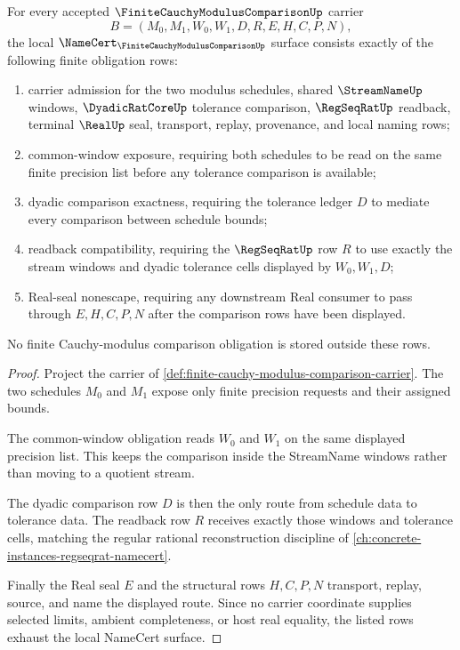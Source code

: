 \begin{theorem}
\label{thm:finite-cauchy-modulus-comparison-namecert-obligations}
For every accepted $\FiniteCauchyModulusComparisonUp$ carrier
$$
B=(M_0,M_1,W_0,W_1,D,R,E,H,C,P,N),
$$
the local $\NameCert_{\FiniteCauchyModulusComparisonUp}$ surface consists exactly of the following finite obligation rows:
\begin{enumerate}
\item carrier admission for the two modulus schedules, shared $\StreamNameUp$ windows, $\DyadicRatCoreUp$ tolerance comparison, $\RegSeqRatUp$ readback, terminal $\RealUp$ seal, transport, replay, provenance, and local naming rows;
\item common-window exposure, requiring both schedules to be read on the same finite precision list before any tolerance comparison is available;
\item dyadic comparison exactness, requiring the tolerance ledger $D$ to mediate every comparison between schedule bounds;
\item readback compatibility, requiring the $\RegSeqRatUp$ row $R$ to use exactly the stream windows and dyadic tolerance cells displayed by $W_0,W_1,D$;
\item Real-seal nonescape, requiring any downstream Real consumer to pass through $E,H,C,P,N$ after the comparison rows have been displayed.
\end{enumerate}
No finite Cauchy-modulus comparison obligation is stored outside these rows.
\end{theorem}
\begin{proof}
Project the carrier of \autoref{def:finite-cauchy-modulus-comparison-carrier}. The two schedules $M_0$ and $M_1$ expose only finite precision requests and their assigned bounds.

The common-window obligation reads $W_0$ and $W_1$ on the same displayed precision list. This keeps the comparison inside the StreamName windows rather than moving to a quotient stream.

The dyadic comparison row $D$ is then the only route from schedule data to tolerance data. The readback row $R$ receives exactly those windows and tolerance cells, matching the regular rational reconstruction discipline of \autoref{ch:concrete-instances-regseqrat-namecert}.

Finally the Real seal $E$ and the structural rows $H,C,P,N$ transport, replay, source, and name the displayed route. Since no carrier coordinate supplies selected limits, ambient completeness, or host real equality, the listed rows exhaust the local NameCert surface.
\end{proof}

